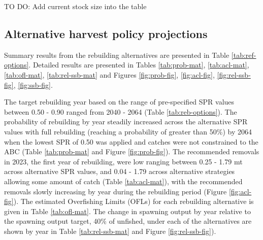 \documentclass[11pt,
  english,
  a4paper,
]{article}
\begin{document}

TO DO: Add current stock size into the table

\leavevmode\tagmcend\tagstructend\par


\hypertarget{alternative-harvest-policy-projections}{%
\subsection{Alternative harvest policy projections}\label{alternative-harvest-policy-projections}}

\leavevmode\tagmcend\tagstructend


Summary results from the rebuilding alternatives are presented in Table \ref{tab:ref-options}. Detailed results are presented in Tables \ref{tab:prob-mat}, \ref{tab:acl-mat}, \ref{tab:ofl-mat}, \ref{tab:rel-ssb-mat} and Figures \ref{fig:prob-fig}, \ref{fig:acl-fig}, \ref{fig:rel-ssb-fig}, \ref{fig:ssb-fig}.

\leavevmode\tagmcend\tagstructend\par


The target rebuilding year based on the range of pre-specified SPR values between 0.50 - 0.90 ranged from 2040 - 2064 (Table \ref{tab:reb-options}). The probability of rebuilding by year steadily increased across the alternative SPR values with full rebuilding (reaching a probability of greater than 50\%) by 2064 when the lowest SPR of 0.50 was applied and catches were not constrained to the ABC (Table \ref{tab:prob-mat} and Figure \ref{fig:prob-fig}). The recommended removals in 2023, the first year of rebuilding, were low ranging between 0.25 - 1.79 mt across alternative SPR values, and 0.04 - 1.79 across alternative strategies allowing some amount of catch (Table \ref{tab:acl-mat}), with the recommended removals slowly increasing by year during the rebuilding period (Figure \ref{fig:acl-fig}). The estimated Overfishing Limits (OFLs) for each rebuilding alternative is given in Table \ref{tab:ofl-mat}. The change in spawning output by year relative to the spawning output target, 40\% of unfished, under each of the alternatives are shown by year in Table \ref{tab:rel-ssb-mat} and Figure \ref{fig:rel-ssb-fig}).
\end{document}
